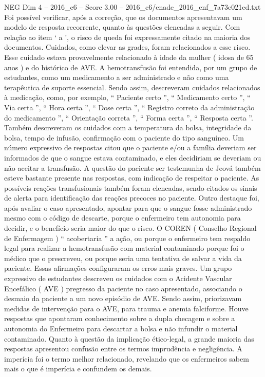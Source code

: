 \begin{textsample}{NEG Dim 4 – 2016\_c6 – Score 3.00 – 2016\_c6/enade\_2016\_enf\_7a73e021ed.txt}
Foi possível verificar, após a correção, que os documentos apresentavam um modelo de resposta recorrente, quanto às questões elencadas a seguir.
Com relação ao item ‘ a ’, o risco de queda foi expressamente citado na maioria dos documentos.
Cuidados, como elevar as grades, foram relacionados a esse risco.
Esse cuidado estava provavelmente relacionado à idade da mulher ( idosa de 65 anos ) e do histórico de AVE.
A hemotransfusão foi entendida, por um grupo de estudantes, como um medicamento a ser administrado e não como uma terapêutica de suporte essencial.
Sendo assim, descreveram cuidados relacionados à medicação, como, por exemplo, “ Paciente certo ”, “ Medicamento certo ”, “ Via certa ”, “ Hora certa ”, “ Dose certa ”, “ Registro correto da administração do medicamento ”, “ Orientação correta ”, “ Forma certa ”, “ Resposta certa ”.
Também descreveram os cuidados com a temperatura da bolsa, integridade da bolsa, tempo de infusão, confirmação com o paciente do tipo sanguíneo.
Um número expressivo de respostas citou que o paciente e/ou a família deveriam ser informados de que o sangue estava contaminado, e eles decidiriam se deveriam ou não aceitar a transfusão.
A questão do paciente ser testemunha de Jeová também esteve bastante presente nas respostas, com indicação de respeitar o paciente.
As possíveis reações transfusionais também foram elencadas, sendo citados os sinais de alerta para identificação das reações precoces no paciente.
Outro destaque foi, após avaliar o caso apresentado, apontar para que o sangue fosse administrado mesmo com o código de descarte, porque o enfermeiro tem autonomia para decidir, e o benefício seria maior do que o risco.
O COREN ( Conselho Regional de Enfermagem ) “ acobertaria ” a ação, ou porque o enfermeiro tem respaldo legal para realizar a hemotransfusão com material contaminado porque foi o médico que o prescreveu, ou porque seria uma tentativa de salvar a vida da paciente.
Essas afirmações configuraram os erros mais graves.
Um grupo expressivo de estudantes descreveu os cuidados com o Acidente Vascular Encefálico ( AVE ) pregresso da paciente no caso apresentado, associando o desmaio da paciente a um novo episódio de AVE.
Sendo assim, priorizavam medidas de intervenção para o AVE, para trauma e anemia falciforme.
Houve respostas que apontaram conhecimento sobre a dupla checagem e sobre a autonomia do Enfermeiro para descartar a bolsa e não infundir o material contaminado.
Quanto à questão da implicação ético-legal, a grande maioria das respostas apresentou confusão entre os termos imprudência e negligência.
A imperícia foi o termo melhor relacionado, revelando que os enfermeiros sabem mais o que é imperícia e confundem os demais.

\end{textsample}
